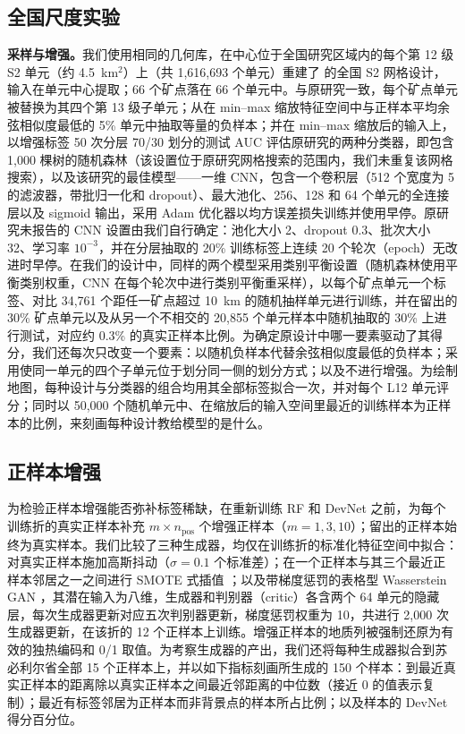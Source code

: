\documentclass[pdflatex,sn-apa]{sn-jnl}
\begin{document}
\subsection{全国尺度实验}\label{sec:national-methods}

\textbf{采样与增强。}我们使用相同的几何库，在中心位于全国研究区域内的每个第 12 级 S2 单元（约 4.5~km$^2$）上（共 1,616,693 个单元）重建了 \citet{Parsa2024} 的全国 S2 网格设计，输入在单元中心提取；66 个矿点落在 66 个单元中。与原研究一致，每个矿点单元被替换为其四个第 13 级子单元；从在 min--max 缩放特征空间中与正样本平均余弦相似度最低的 5\% 单元中抽取等量的负样本；并在 min--max 缩放后的输入上，以增强标签 50 次分层 70/30 划分的测试 AUC 评估原研究的两种分类器，即包含 1,000 棵树的随机森林（该设置位于原研究网格搜索的范围内，我们未重复该网格搜索），以及该研究的最佳模型——一维 CNN，包含一个卷积层（512 个宽度为 5 的滤波器，带批归一化和 dropout）、最大池化、256、128 和 64 个单元的全连接层以及 sigmoid 输出，采用 Adam 优化器以均方误差损失训练并使用早停。原研究未报告的 CNN 设置由我们自行确定：池化大小 2、dropout 0.3、批次大小 32、学习率 $10^{-3}$，并在分层抽取的 20\% 训练标签上连续 20 个轮次（epoch）无改进时早停。在我们的设计中，同样的两个模型采用类别平衡设置（随机森林使用平衡类别权重，CNN 在每个轮次中进行类别平衡重采样），以每个矿点单元一个标签、对比 34,761 个距任一矿点超过 10~km 的随机抽样单元进行训练，并在留出的 30\% 矿点单元以及从另一个不相交的 20,855 个单元样本中随机抽取的 30\% 上进行测试，对应约 0.3\% 的真实正样本比例。为确定原设计中哪一要素驱动了其得分，我们还每次只改变一个要素：以随机负样本代替余弦相似度最低的负样本；采用使同一单元的四个子单元位于划分同一侧的划分方式；以及不进行增强。为绘制地图，每种设计与分类器的组合均用其全部标签拟合一次，并对每个 L12 单元评分；同时以 50,000 个随机单元中、在缩放后的输入空间里最近的训练样本为正样本的比例，来刻画每种设计教给模型的是什么。

\subsection{正样本增强}\label{sec:augmentation}

为检验正样本增强能否弥补标签稀缺，在重新训练 RF 和 DevNet 之前，为每个训练折的真实正样本补充 $m \times n_{\mathrm{pos}}$ 个增强正样本（$m = 1, 3, 10$）；留出的正样本始终为真实样本。我们比较了三种生成器，均仅在训练折的标准化特征空间中拟合：对真实正样本施加高斯抖动（$\sigma = 0.1$ 个标准差）；在一个正样本与其三个最近正样本邻居之一之间进行 SMOTE 式插值 \citep{Chawla2002}；以及带梯度惩罚的表格型 Wasserstein GAN \citep[WGAN-GP;][]{Goodfellow2014,Arjovsky2017,Gulrajani2017}，其潜在输入为八维，生成器和判别器（critic）各含两个 64 单元的隐藏层，每次生成器更新对应五次判别器更新，梯度惩罚权重为 10，共进行 2,000 次生成器更新，在该折的 12 个正样本上训练。增强正样本的地质列被强制还原为有效的独热编码和 0/1 取值。为考察生成器的产出，我们还将每种生成器拟合到苏必利尔省全部 15 个正样本上，并以如下指标刻画所生成的 150 个样本：到最近真实正样本的距离除以真实正样本之间最近邻距离的中位数（接近 0 的值表示复制）；最近有标签邻居为正样本而非背景点的样本所占比例；以及样本的 DevNet 得分百分位。
\end{document}
